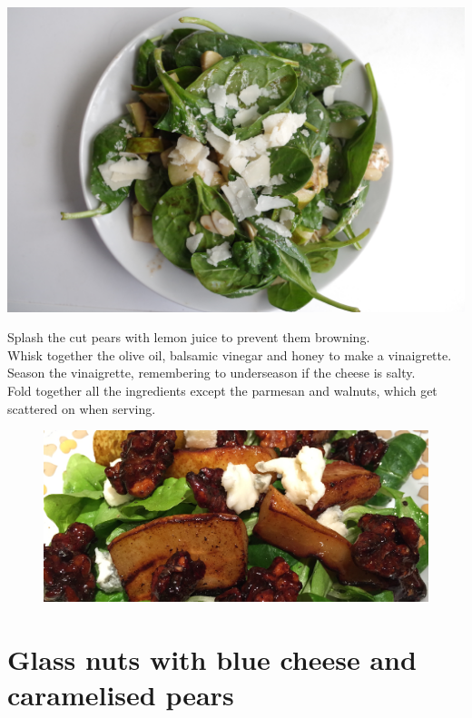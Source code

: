 \documentclass{tufte-book}
\begin{document}
\begin{marginfigure}%
  \includegraphics[width=\linewidth]{pearsaladabove.JPG}
\end{marginfigure}

\smallskip
Splash the cut pears with lemon juice to prevent them browning.
\\Whisk together the olive oil, balsamic vinegar and honey to make a vinaigrette.
\\Season the vinaigrette, remembering to underseason if the cheese is salty.
\\Fold together all the ingredients except the parmesan and walnuts, which get scattered on when serving.

\newpage

\begin{figure}[h]
  \includegraphics[width=\linewidth]{pearwithbluecheese.JPG}
\end{figure}

\section{Glass nuts with blue cheese and caramelised pears}
\end{document}
